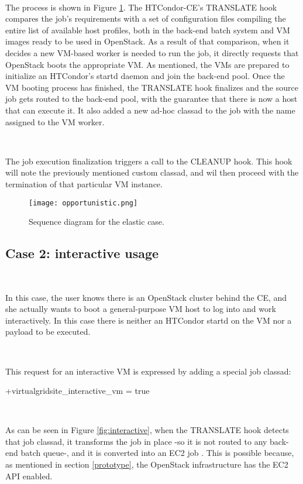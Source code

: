 \documentclass[a4paper]{jpconf}
\begin{document}
~

The process is shown in Figure \ref{fig:elastic}. 
The HTCondor-CE's TRANSLATE hook compares the job's requirements with a set of
configuration files compiling the entire list of available host profiles, 
both in the back-end batch system and VM images ready to be used in OpenStack.
As a result of that comparison, when it decides a new VM-based worker is needed
to run the job, it directly requests that OpenStack boots the appropriate VM.
As mentioned, the VMs are prepared to initialize an HTCondor's startd daemon and
join the back-end pool.
Once the VM booting process has finished, the TRANSLATE hook finalizes and the source job gets routed to the back-end pool,
with the guarantee that there is now a host that can execute it. 
It also added a new ad-hoc classad to the job with the name assigned to the VM
worker.

~

The job execution finalization triggers a call to the CLEANUP hook.
This hook will note the previously mentioned custom classad, and wil then
proceed with the termination of that particular VM instance.


\begin{figure}[h]
    \centering
    \texttt{[image: opportunistic.png]}
    \caption{Sequence diagram for the elastic case.}
    \label{fig:elastic}
\end{figure}


\subsection{Case 2: interactive usage}

~

In this case, the user knows there is an OpenStack cluster behind the CE, 
and she actually wants to boot a general-purpose VM host to log into and work
interactively. 
In this case there is neither an HTCondor startd on the VM nor a payload to be executed.

~

This request for an interactive VM is expressed by adding a special job classad: 
\begin{center}
    +virtualgridsite\_interactive\_vm = true
\end{center}

~

As can be seen in Figure \ref{fig:interactive}, when the TRANSLATE hook detects that job classad, 
it transforms the job in place -so it is not routed to any back-end batch
queue-, and it is converted into an EC2 job \cite{condorec2}.
This is possible because, as mentioned in section \ref{prototype}, the OpenStack infrastructure has the EC2 API enabled. 
\end{document}
